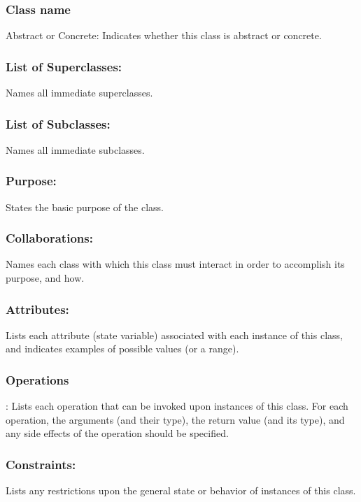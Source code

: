 \documentclass[12pt]{article}
\begin{document}
\subsubsection{ Class name}
 Abstract or Concrete: 
Indicates whether this class is abstract or concrete. 
\subsubsection {List of Superclasses:} 
Names all immediate superclasses. 
\subsubsection {List of Subclasses:} 
Names all immediate subclasses. 
\subsubsection {Purpose: }
States the basic purpose of the class. 
\subsubsection {Collaborations: }
Names each class with which this class must interact in order to accomplish its purpose, and how. 
\subsubsection {Attributes: }
Lists each attribute (state variable) associated with each instance of this class, and indicates examples of possible values (or a range). 
\subsubsection {Operations}: 
Lists each operation that can be invoked upon instances of this class. For each operation, the arguments (and their type), the return value (and its type), and any side effects of the operation should be specified. 
\subsubsection {Constraints:} 
Lists any restrictions upon the general state or behavior of instances of this class. 
\end{document}
